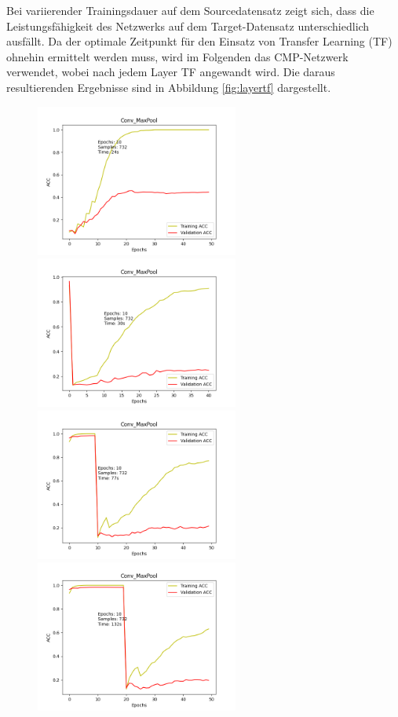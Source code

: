 Bei variierender Trainingsdauer auf dem Sourcedatensatz zeigt sich, dass die Leistungsfähigkeit des Netzwerks auf dem Target-Datensatz 
unterschiedlich ausfällt. Da der optimale Zeitpunkt für den Einsatz von Transfer Learning (TF) ohnehin ermittelt werden muss, wird im 
Folgenden das CMP-Netzwerk verwendet, wobei nach jedem Layer TF angewandt wird. Die daraus resultierenden Ergebnisse sind in Abbildung 
\ref{fig:layertf} dargestellt.

\begin{figure}[htpb]
    \includegraphics[height=5cm]{../../Plots/ba_plots/convmaxpool/wotr.png}
    \includegraphics[height=5cm]{../../Plots/ba_plots/convmaxpool/epochTFtr.png}
    \includegraphics[height=5cm]{../../Plots/ba_plots/convmaxpool/1TFtr.png}
    \includegraphics[height=5cm]{../../Plots/ba_plots/convmaxpool/2TFtr.png}

\end{figure}
